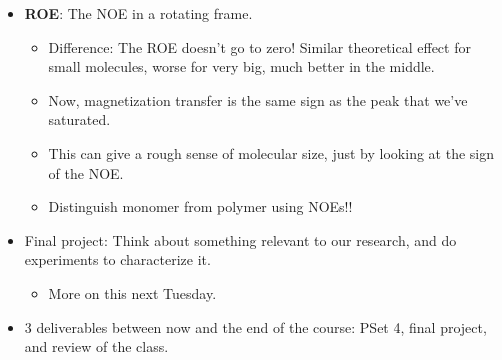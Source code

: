 \documentclass[../notes.tex]{subfiles}
\begin{document}
\begin{itemize}
\begin{itemize}
        \begin{itemize}
            \item Multiply by $\omega_0$, the frequency of the nucleus in the spectrometer (e.g., \SI{500}{\mega\hertz} for a proton on a 500).
            \item Takeaway: If you're molecule is in the middle of this unfortuante regime, your NOE is going to be zero. You have to look out for that!
            \item Positive NOE: Saturate one nucleus, transfer its magnetization to another nucleus, and then revert and the other one flips.
            \item Example: Saturating adenosine's $1'$ proton correlates it to the $2'$ proton and base 5-membered ring's proton. The sample used was extremely concentrated.
            \item When interpreting an NOE experiment, focus on the strong signals, not the weak; the weak ones are either incomplete subtraction or not our primary determination. Don't anticipate a bump 3-4 carbons away and then see a tiny one and say, "look, an NOE!"
            \item Comparing NOEs on both diastereomers is a better idea than just interpreting one of them.
        \end{itemize}
    \end{itemize}
    \item \textbf{ROE}: The NOE in a rotating frame.
    \begin{itemize}
        \item Difference: The ROE doesn't go to zero! Similar theoretical effect for small molecules, worse for very big, much better in the middle.
        \item Now, magnetization transfer is the same sign as the peak that we've saturated.
        \item This can give a rough sense of molecular size, just by looking at the sign of the NOE.
        \item Distinguish monomer from polymer using NOEs!!
    \end{itemize}
    \item Final project: Think about something relevant to our research, and do experiments to characterize it.
    \begin{itemize}
        \item More on this next Tuesday.
    \end{itemize}
    \item 3 deliverables between now and the end of the course: PSet 4, final project, and review of the class.
\end{itemize}
\end{document}

